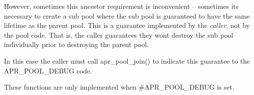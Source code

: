 However, sometimes this ancestor requirement is inconvenient -- sometimes it\textquotesingle{}s necessary to create a sub pool where the sub pool is guaranteed to have the same lifetime as the parent pool. This is a guarantee implemented by the {\itshape caller}, not by the pool code. That is, the caller guarantees they won\textquotesingle{}t destroy the sub pool individually prior to destroying the parent pool.

In this case the caller must call apr\+\_\+pool\+\_\+join() to indicate this guarantee to the A\+P\+R\+\_\+\+P\+O\+O\+L\+\_\+\+D\+E\+B\+UG code.

These functions are only implemented when \#\+A\+P\+R\+\_\+\+P\+O\+O\+L\+\_\+\+D\+E\+B\+UG is set. 